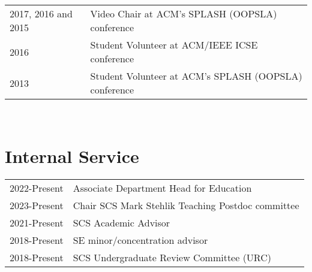 \documentclass[10pt]{article}
\begin{document}
\begin{tabular}{p{2.5cm}p{10.5cm}}
2017, 2016 and 2015 &Video Chair at ACM's SPLASH (OOPSLA) conference\\
2016 &Student Volunteer at ACM/IEEE ICSE conference\\
2013 &Student Volunteer at ACM's SPLASH (OOPSLA) conference\\
\end{tabular}\\

\vspace{10pt}




\section{Internal Service}

\noindent\begin{tabular}{p{2.5cm}p{10.5cm}}
2022-Present &Associate Department Head for Education\\
2023-Present & Chair SCS Mark Stehlik Teaching Postdoc committee\\
2021-Present & SCS Academic Advisor\\
2018-Present & SE minor/concentration advisor\\
2018-Present & SCS Undergraduate Review Committee (URC)\\

\end{tabular}\\

\vspace{10pt}






%
%
%
\end{document}
